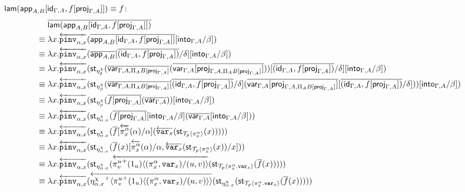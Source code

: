 \documentclass[10pt]{article}
\theoremstyle{definition}
\newcommand{\id}{\mathsf{id}}
\newcommand{\rewrite}[2]{\overleftarrow{#1}(#2)}
\newcommand\UI[2]{\ensuremath{\lambda #1.#2}}
\newcommand\StI[2]{\ensuremath{\mathsf{st}_{#1}(#2)}}
\newcommand\TrPlus[2]{\ensuremath{{#1}^+(#2)}}
\newcommand\ApEl[2]{\mathcal{T}_{#1}\langle#2\rangle}
\newcommand\bdot[0]{\mathbin{.}}
\newcommand\ap[2]{\ensuremath{#1 \langle #2 \rangle }}
\newcommand\ApPlus[2]{\ensuremath{{#1}^+ \langle #2 \rangle }}
\begin{document}
\begin{enumerate}[style = multiline, labelwidth = 80pt]
\item[{$\qlam(\qapp{A,B}[\id_{\Gamma, A}, f[\proj{\Gamma, A}]]) \equiv f$}:] \begin{align*}
&\upstairs{\qlam(\qapp{A,B}[\id_{\Gamma, A}, f[\proj{\Gamma, A}]])} \\
\equiv{} &\UI{x}{\rewrite{\pinv{\alpha,x}}{\upstairs{\qapp{A,B}[\id_{\Gamma, A}, f[\proj{\Gamma, A}]]}[\into{\Gamma, A}/\beta]}} \\
\equiv{} &\UI{x}{\rewrite{\pinv{\alpha,x}}{\upstairs{\qapp{A,B}}[\upstairs{(\id_{\Gamma, A}, f[\proj{\Gamma, A}])}/\delta][\into{\Gamma, A}/\beta]}} \\
\equiv{} &\UI{x}{\rewrite{\pinv{\alpha,x}}{\StI{\eta^\chi_\delta}{\upstairs{\qvar{\Gamma, A, \Pi_A B[\proj{\Gamma, A}]}}(\upstairs{\qvar{\Gamma, A}[\proj{\Gamma, A, \Pi_A B[\proj{\Gamma, A}]}]})}[\upstairs{(\id_{\Gamma, A}, f[\proj{\Gamma, A}])}/\delta][\into{\Gamma, A}/\beta]}} \\
\equiv{} &\UI{x}{\rewrite{\pinv{\alpha,x}}{\StI{\eta^\chi_\beta}{\upstairs{\qvar{\Gamma, A, \Pi_A B[\proj{\Gamma, A}]}}[\upstairs{(\id_{\Gamma, A}, f[\proj{\Gamma, A}])}/\delta](\upstairs{\qvar{\Gamma, A}[\proj{\Gamma, A, \Pi_A B[\proj{\Gamma, A}]}]}[\upstairs{(\id_{\Gamma, A}, f[\proj{\Gamma, A}])}/\delta])}[\into{\Gamma, A}/\beta]}} \\
\equiv{} &\UI{x}{\rewrite{\pinv{\alpha,x}}{\StI{\eta^\chi_\beta}{\upstairs{f[\proj{\Gamma, A}]}(\upstairs{\qvar{\Gamma, A}})}[\into{\Gamma, A}/\beta]} \\
\equiv{} &\UI{x}{\rewrite{\pinv{\alpha,x}}{\StI{\eta^\chi_{\alpha.x}}{\upstairs{f[\proj{\Gamma, A}]}[\into{\Gamma, A}/\beta](\upstairs{\qvar{\Gamma, A}}[\into{\Gamma, A}/\beta]}}}} \\
\equiv{} &\UI{x}{\rewrite{\pinv{\alpha,x}}{\StI{\eta^\chi_{\alpha.x}}{\upstairs{f}[\rewrite{\pi^\alpha_x}{\alpha}/\alpha](\rewrite{\var{x}}{\StI{\ApEl{p}{\pi^{\alpha}_x}}{x}})}}} \\
\equiv{} &\UI{x}{\rewrite{\pinv{\alpha,x}}{\StI{\eta^\chi_{\alpha.x}}{\upstairs{f}(x)[\rewrite{\pi^\alpha_x}{\alpha}/\alpha,\rewrite{\var{x}}{\StI{\ApEl{p}{\pi^{\alpha}_x}}{x}}/x]}}} \\
\equiv{} &\UI{x}{\rewrite{\pinv{\alpha,x}}{\StI{\eta^\chi_{\alpha.x}}{\rewrite{\ap{\TrPlus{\pi^u_v}{1_u}}{(\pi^\alpha_x,\var{x})/(u,v)}}{\StI{\ApEl{p}{\pi^\alpha_x \bdot \var{x}}}{\upstairs{f}(x)}}}}} \\
\equiv{} &\UI{x}{\rewrite{\pinv{\alpha,x}}{\rewrite{\ApPlus{\eta^\chi_{\alpha.x}}{\ap{\TrPlus{\pi^u_v}{1_u}}{(\pi^\alpha_x,\var{x})/(u,v)}}}{\StI{\eta^\chi_{\alpha.x}}{\StI{\ApEl{p}{\pi^\alpha_x \bdot \var{x}}}{\upstairs{f}(x)}}}}} \\

\end{align*}
\end{enumerate}
\end{document}

